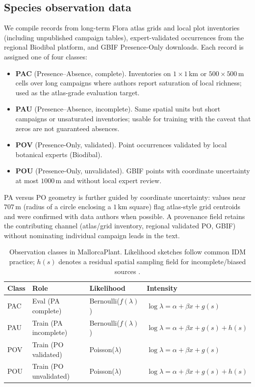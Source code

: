 \documentclass[11pt,letterpaper]{article}
\begin{document}
\subsection{Species observation data}
\label{sec:obs}

We compile records from long-term Flora atlas grids and local plot inventories (including unpublished campaign tables), expert-validated occurrences from the regional Biodibal platform, and GBIF Presence-Only downloads.
Each record is assigned one of four classes:

\begin{itemize}
  \item \textbf{PAC} (Presence--Absence, complete).
    Inventories on $1\times1$\,km or $500\times500$\,m cells over long campaigns where authors report saturation of local richness; used as the atlas-grade evaluation target.
  \item \textbf{PAU} (Presence--Absence, incomplete).
    Same spatial units but short campaigns or unsaturated inventories; usable for training with the caveat that zeros are not guaranteed absences.
  \item \textbf{POV} (Presence-Only, validated).
    Point occurrences validated by local botanical experts (Biodibal).
  \item \textbf{POU} (Presence-Only, unvalidated).
    GBIF points with coordinate uncertainty at most $1000$\,m and without local expert review.
\end{itemize}

PA versus PO geometry is further guided by coordinate uncertainty: values near $707$\,m (radius of a circle enclosing a $1$\,km square) flag atlas-style grid centroids and were confirmed with data authors when possible.
A provenance field retains the contributing channel (atlas/grid inventory, regional validated PO, GBIF) without nominating individual campaign leads in the text.

\begin{table}[t]
  \centering
  \caption{Observation classes in MallorcaPlant. Likelihood sketches follow common IDM practice; $h(s)$ denotes a residual spatial sampling field for incomplete/biased sources \citep{simmonds2020more}.}
  \label{tab:classes}
  \setlength{\tabcolsep}{4pt}
  \small
  \begin{tabular}{@{}llll@{}}
    \toprule
    Class & Role & Likelihood & Intensity \\
    \midrule
    PAC & Eval (PA complete) &
      Bernoulli($f(\lambda)$) &
      $\log\lambda=\alpha+\beta x+g(s)$ \\
    PAU & Train (PA incomplete) &
      Bernoulli($f(\lambda)$) &
      $\log\lambda=\alpha+\beta x+g(s)+h(s)$ \\
    POV & Train (PO validated) &
      Poisson($\lambda$) &
      $\log\lambda=\alpha+\beta x+g(s)$ \\
    POU & Train (PO unvalidated) &
      Poisson($\lambda$) &
      $\log\lambda=\alpha+\beta x+g(s)+h(s)$ \\
    \bottomrule
  \end{tabular}
\end{table}
\end{document}
